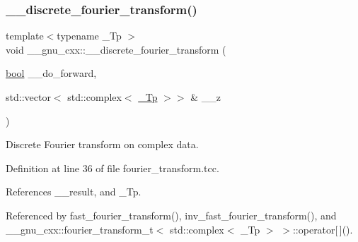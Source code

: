 \mbox{\label{namespace____gnu__cxx_a6dff31b609fa2f8678c729d557dbae49}} 
\subsubsection{\texorpdfstring{\+\_\+\+\_\+discrete\+\_\+fourier\+\_\+transform()}{\_\_discrete\_fourier\_transform()}}
{\footnotesize\ttfamily template$<$typename \+\_\+\+Tp $>$ \\
void \+\_\+\+\_\+gnu\+\_\+cxx\+::\+\_\+\+\_\+discrete\+\_\+fourier\+\_\+transform (\begin{DoxyParamCaption}\item[{\hyperlink{namespace____gnu__cxx_ae83aca57f97767d5d09188718728a0ac}{bool}}]{\+\_\+\+\_\+do\+\_\+forward,  }\item[{std\+::vector$<$ std\+::complex$<$ \hyperlink{namespace____gnu__cxx_a3b19a9c800ca194374ef9172290f7d79}{\+\_\+\+Tp} $>$$>$ \&}]{\+\_\+\+\_\+z }\end{DoxyParamCaption})}

Discrete Fourier transform on complex data. 

Definition at line 36 of file fourier\+\_\+transform.\+tcc.



References \+\_\+\+\_\+result, and \+\_\+\+Tp.



Referenced by fast\+\_\+fourier\+\_\+transform(), inv\+\_\+fast\+\_\+fourier\+\_\+transform(), and \+\_\+\+\_\+gnu\+\_\+cxx\+::fourier\+\_\+transform\+\_\+t$<$ std\+::complex$<$ \+\_\+\+Tp $>$ $>$\+::operator\mbox{[}$\,$\mbox{]}().


